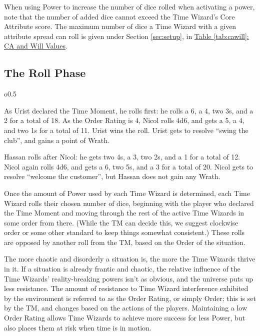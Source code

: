 \documentclass[twoside]{article}
\newenvironment{examplebox}[1]{\begin{tcolorbox}[colback=green!5!white,colframe=green!75!black,title={Example: #1}]}{\end{tcolorbox}\vspace{-30pt}}
\begin{document}
When using Power to increase the number of dice rolled when activating a power, note that the
number of added dice cannot exceed the Time Wizard's Core Attribute score. The maximum number
of dice a Time Wizard with a given attribute spread can roll is given under Section
\ref*{sec:setup}, in \hyperref[tab:cawill]{Table \ref*{tab:cawill}: CA and Will Values}.

\subsection{The Roll Phase} \label{ssec:roll-phase}
\begin{wrapfigure}{o}{0.5\textwidth}
   \vspace{-15pt}
   \begin{examplebox}{The Roll Phase}
      As Urist declared the Time Moment, he rolls first: he rolls a 6, a 4, two 3s, and a 2 for
      a total of 18. As the Order Rating is 4, Nicol rolls 4d6, and gets a 5, a 4, and two 1s
      for a total of 11. Urist wins the roll. Urist gets to resolve ``swing the club'', and
      gains a point of Wrath.

      Hassan rolls after Nicol: he gets two 4s, a 3, two 2s, and a 1 for a total of 12. Nicol
      again rolls 4d6, and gets a 6, two 5s, and a 3 for a total of 20. Nicol gets to resolve
      ``welcome the customer'', but Hassan does not gain any Wrath.
   \end{examplebox}
   \vspace{20pt}
\end{wrapfigure}

Once the amount of Power used by each Time Wizard is determined, each Time Wizard rolls their
chosen number of dice, beginning with the player who declared the Time Moment and moving through
the rest of the active Time Wizards in some order from there. (While the TM can decide this, we
suggest clockwise order or some other standard to keep things somewhat consistent.) These rolls
are opposed by another roll from the TM, based on the Order of the situation.

The more chaotic and disorderly a situation is, the more the Time Wizards thrive in it. If a
situation is already frantic and chaotic, the relative influence of the Time Wizards'
reality-breaking powers isn't as obvious, and the universe puts up less resistance. The amount
of resistance to Time Wizard interference exhibited by the environment is referred to as the
Order Rating, or simply Order; this is set by the TM, and changes based on the actions of the
players. Maintaining a low Order Rating allows Time Wizards to achieve more success for less
Power, but also places them at risk when time is in motion.
\end{document}

